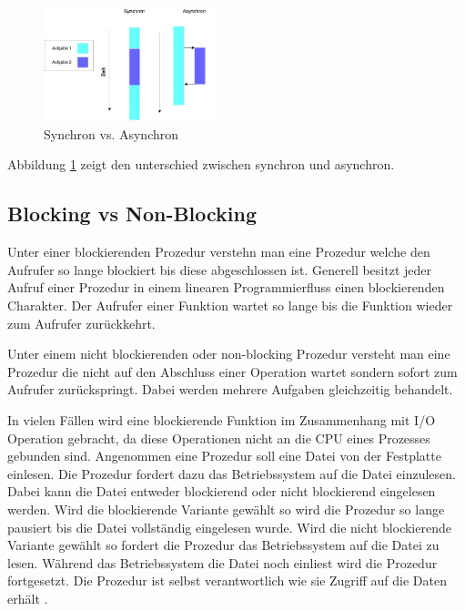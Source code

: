 \begin{figure}[!htb]
  \centering
  \includegraphics[width=5cm]{images/synchron_vs_asynchron.jpg}
  \caption{
    Synchron vs. Asynchron
  }
  \label{figure:syncron_vs_async}
\end{figure}

Abbildung \ref{figure:syncron_vs_async} zeigt den unterschied zwischen synchron und asynchron. 

\subsection{Blocking vs Non-Blocking}

Unter einer blockierenden Prozedur verstehn man eine Prozedur welche den Aufrufer so lange blockiert bis diese abgeschlossen ist. Generell besitzt jeder Aufruf einer Prozedur in einem linearen Programmierfluss einen blockierenden Charakter. Der Aufrufer einer Funktion wartet so lange bis die Funktion wieder zum Aufrufer zurückkehrt. 

Unter einem nicht blockierenden oder non-blocking Prozedur versteht man eine Prozedur die nicht auf den Abschluss einer Operation wartet sondern sofort zum Aufrufer zurückspringt. Dabei werden mehrere Aufgaben gleichzeitig behandelt.  

In vielen Fällen wird eine blockierende Funktion im Zusammenhang mit I/O Operation gebracht, da diese Operationen nicht an die CPU eines Prozesses gebunden sind. Angenommen eine Prozedur soll eine Datei von der Festplatte einlesen. Die Prozedur fordert dazu das Betriebssystem auf die Datei einzulesen. Dabei kann die Datei entweder blockierend oder nicht blockierend eingelesen werden. Wird die blockierende Variante gewählt so wird die Prozedur so lange pausiert bis die Datei vollständig eingelesen wurde. Wird die nicht blockierende Variante gewählt so fordert die Prozedur das Betriebssystem auf die Datei zu lesen. Während das Betriebssystem die Datei noch einliest wird die Prozedur fortgesetzt. Die Prozedur ist selbst verantwortlich wie sie Zugriff auf die Daten erhält \cite[p. 47]{Erb2012}.

